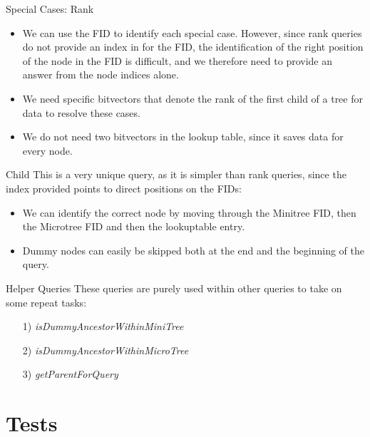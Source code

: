 \documentclass{beamer}
\begin{document}
\begin{frame}{Special Cases: Rank}
	\begin{itemize}
	\item
		We can use the FID to identify each special case. However, since rank queries do not provide an index in for the FID, the identification of the right position of the node in the FID is difficult, and we therefore need to provide an answer from the node indices alone.
	\item
		We need specific bitvectors that denote the rank of the first child of a tree for data to resolve these cases.
	\item
		We do not need two bitvectors in the lookup table, since it saves data for every node.
	\end{itemize}
\end{frame}

\begin{frame}{Child}
	This is a very unique query, as it is simpler than rank queries, since the index provided points to direct positions on the FIDs:
	\begin{itemize}
	\item
		We can identify the correct node by moving through the Minitree FID, then the Microtree FID and then the lookuptable entry.
	\item
		Dummy nodes can easily be skipped both at the end and the beginning of the query.
	\end{itemize}
\end{frame}

\begin{frame}{Helper Queries}
	These queries are purely used within other queries to take on some repeat tasks:
	\begin{itemize}
	\item[1)] \textit{isDummyAncestorWithinMiniTree}
	\item[2)] \textit{isDummyAncestorWithinMicroTree}
	\item[3)] \textit{getParentForQuery}
	\end{itemize}
\end{frame}

\section{Tests}
\end{document}

